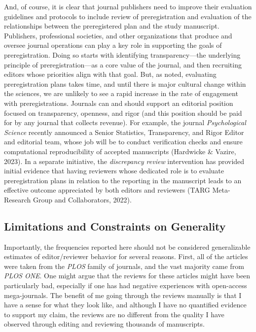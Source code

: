 \documentclass[authordate, meta, issue]{jote-new-article}
\begin{document}
	And, of course, it is clear that journal publishers need to improve their evaluation guidelines and protocols to include review of preregistration and evaluation of the relationships between the preregistered plan and the study manuscript. Publishers, professional societies, and other organizations that produce and oversee journal operations can play a key role in supporting the goals of preregistration. Doing so starts with identifying transparency—the underlying principle of preregistration—as a core value of the journal, and then recruiting editors whose priorities align with that goal. But, as noted, evaluating preregistration plans takes time, and until there is major cultural change within the sciences, we are unlikely to see a rapid increase in the rate of engagement with preregistrations. Journals can and should support an editorial position focused on transparency, openness, and rigor (and this position should be paid for by any journal that collects revenue). For example, the journal \emph{Psychological Science} recently announced a Senior Statistics, Transparency, and Rigor Editor and editorial team, whose job will be to conduct verification checks and ensure computational reproducibility of accepted manuscripts (Hardwicke \& Vazire, 2023). In a separate initiative, the \emph{discrepancy review} intervention has provided initial evidence that having reviewers whose dedicated role is to evaluate preregistration plans in relation to the reporting in the manuscript leads to an effective outcome appreciated by both editors and reviewers (TARG Meta-Research Group and Collaborators, 2022).



	\subsection{Limitations and Constraints on Generality}



	Importantly, the frequencies reported here should not be considered generalizable estimates of editor/reviewer behavior for several reasons. First, all of the articles were taken from the \emph{PLOS} family of journals, and the vast majority came from \emph{PLOS ONE}. One might argue that the reviews for these articles might have been particularly bad, especially if one has had negative experiences with open-access mega-journals. The benefit of me going through the reviews manually is that I have a sense for what they look like, and although I have no quantified evidence to support my claim, the reviews are no different from the quality I have observed through editing and reviewing thousands of manuscripts.
\end{document}
